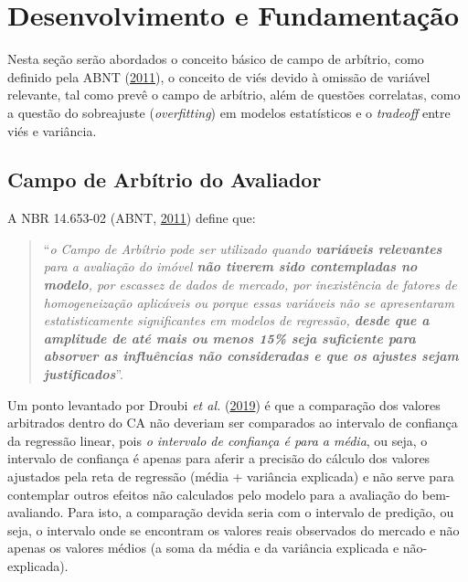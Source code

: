\documentclass[
  a4paper, 11pt]{article}
\begin{document}
\hypertarget{desenvolvimento-e-fundamentauxe7uxe3o}{%
\section{Desenvolvimento e
Fundamentação}\label{desenvolvimento-e-fundamentauxe7uxe3o}}

Nesta seção serão abordados o conceito básico de campo de arbítrio, como
definido pela ABNT (\protect\hyperlink{ref-NBR1465302}{2011}), o
conceito de viés devido à omissão de variável relevante, tal como prevê
o campo de arbítrio, além de questões correlatas, como a questão do
sobreajuste (\emph{overfitting}) em modelos estatísticos e o
\emph{tradeoff} entre viés e variância.

\hypertarget{campo-de-arbuxedtrio-do-avaliador}{%
\subsection{Campo de Arbítrio do
Avaliador}\label{campo-de-arbuxedtrio-do-avaliador}}

A NBR 14.653-02 (ABNT, \protect\hyperlink{ref-NBR1465302}{2011}) define
que:

\begin{quote}
``\emph{o Campo de Arbítrio pode ser utilizado quando \textbf{variáveis
relevantes} para a avaliação do imóvel \textbf{não tiverem sido
contempladas no modelo}, por escassez de dados de mercado, por
inexistência de fatores de homogeneização aplicáveis ou porque essas
variáveis não se apresentaram estatisticamente significantes em modelos
de regressão, \textbf{desde que a amplitude de até mais ou menos 15\%
seja suficiente para absorver as influências não consideradas e que os
ajustes sejam justificados}}''.
\end{quote}

Um ponto levantado por Droubi \emph{et al.}
(\protect\hyperlink{ref-droubi2019}{2019}) é que a comparação dos
valores arbitrados dentro do CA não deveriam ser comparados ao intervalo
de confiança da regressão linear, pois \emph{o intervalo de confiança é
para a média}, ou seja, o intervalo de confiança é apenas para aferir a
precisão do cálculo dos valores ajustados pela reta de regressão (média
+ variância explicada) e não serve para contemplar outros efeitos não
calculados pelo modelo para a avaliação do bem-avaliando. Para isto, a
comparação devida seria com o intervalo de predição, ou seja, o
intervalo onde se encontram os valores reais observados do mercado e não
apenas os valores médios (a soma da média e da variância explicada e
não-explicada).
\end{document}
